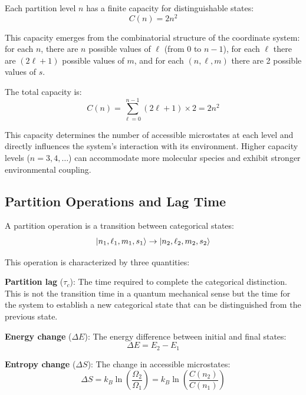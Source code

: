 \documentclass[twocolumn,superscriptaddress,prb,10pt]{revtex4-2}
\begin{document}
Each partition level $n$ has a finite capacity for distinguishable states:
\begin{equation}
C(n) = 2n^2
\label{eq:capacity}
\end{equation}

This capacity emerges from the combinatorial structure of the coordinate system: for each $n$, there are $n$ possible values of $\ell$ (from 0 to $n-1$), for each $\ell$ there are $(2\ell+1)$ possible values of $m$, and for each $(n,\ell,m)$ there are 2 possible values of $s$.

The total capacity is:
\begin{equation}
C(n) = \sum_{\ell=0}^{n-1} (2\ell+1) \times 2 = 2n^2
\label{eq:capacity_sum}
\end{equation}

This capacity determines the number of accessible microstates at each level and directly influences the system's interaction with its environment. Higher capacity levels ($n=3,4,\ldots$) can accommodate more molecular species and exhibit stronger environmental coupling.

\subsection{Partition Operations and Lag Time}

A partition operation is a transition between categorical states:
\begin{equation}
\ket{n_1, \ell_1, m_1, s_1} \to \ket{n_2, \ell_2, m_2, s_2}
\label{eq:partition_op}
\end{equation}

This operation is characterized by three quantities:

\textbf{Partition lag} ($\tau_c$): The time required to complete the categorical distinction. This is not the transition time in a quantum mechanical sense but the time for the system to establish a new categorical state that can be distinguished from the previous state.

\textbf{Energy change} ($\Delta E$): The energy difference between initial and final states:
\begin{equation}
\Delta E = E_2 - E_1
\label{eq:energy_change}
\end{equation}

\textbf{Entropy change} ($\Delta S$): The change in accessible microstates:
\begin{equation}
\Delta S = k_B \ln\left(\frac{\Omega_2}{\Omega_1}\right) = k_B \ln\left(\frac{C(n_2)}{C(n_1)}\right)
\label{eq:entropy_change}
\end{equation}
\end{document}
